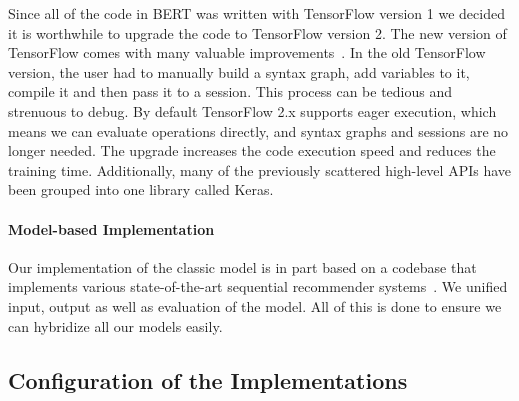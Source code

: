 Since all of the code in BERT was written with TensorFlow version 1 we decided it is worthwhile to upgrade the code to TensorFlow version 2. The new version of TensorFlow comes with many valuable improvements~\cite{Tensorflow}. In the old TensorFlow version, the user had to manually build a syntax graph, add variables to it, compile it and then pass it to a session. This process can be tedious and strenuous to debug. By default TensorFlow 2.x supports eager execution, which means we can evaluate operations directly, and syntax graphs and sessions are no longer needed. The upgrade increases the code execution speed and reduces the training time. Additionally, many of the previously scattered high-level APIs have been grouped into one library called Keras.

\paragraph{Model-based Implementation}
Our implementation of the classic model is in part based on a codebase that implements various state-of-the-art sequential recommender systems~\cite{seqrecsota}. We unified input, output as well as evaluation of the model. All of this is done to ensure we can hybridize all our models easily. 

% 

%
% 


\subsection{Configuration of the Implementations}
